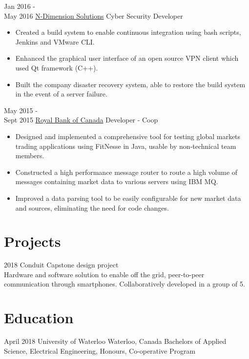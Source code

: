 \documentclass[letterpaper]{twentysecondcv} %
\begin{document}
\begin{twenty}
    \twentyitem
   		{Jan 2016 - \\ May 2016}
        {\href{https://www.n-dimension.com}{N-Dimension Solutions}}
        {Cyber Security Developer}
        {}
        {
        {\begin{itemize}
        \item Created a build system to enable continuous integration using bash scripts, Jenkins and VMware CLI.
        \item Enhanced the graphical user interface of an open source VPN client which used Qt framework (C++).
        \item Built the company disaster recovery system, able to restore the build system in the event of a server failure.
    \end{itemize}}
        }
        
     \twentyitem
   		{May 2015 - \\ Sept 2015}
        {\href{https://www.rbcwealthmanagement.com}{Royal Bank of Canada}}
        {Developer - Coop}
        {}
        {
        \begin{itemize}
        \item Designed and implemented a comprehensive tool for testing global markets trading applications using FitNesse in Java, usable by non-technical team members.
        \item Constructed a high performance message router to route a high volume of messages containing market data to various servers using IBM MQ.
        \item Improved a data parsing tool to be easily configurable for new market data and sources, eliminating the need for code changes.
    \end{itemize}
    	}
\end{twenty}

\section{Projects}
\begin{twenty}
\twentyitem
   		{2018}
        {Conduit}
        {Capstone design project}
        {}
        {
        \\
        Hardware and software solution to enable off the grid, peer-to-peer communication through smartphones. Collaboratively developed in a group of 5. 
        }
\end{twenty}

\section{Education}
\begin{twenty}
\twentyitem
   		{April 2018}
        {University of Waterloo}
        {Waterloo, Canada}
        {}
        {
        Bachelors of Applied Science, Electrical Engineering, Honours, Co-operative Program
        }
\end{twenty}
\end{document}
